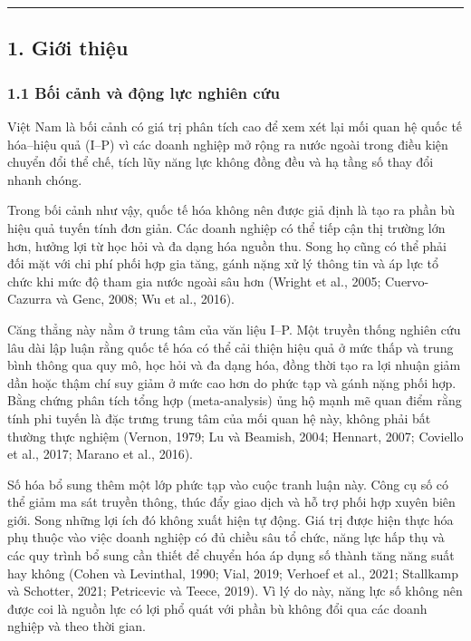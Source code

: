 \documentclass[12pt,a4paper]{article}
\begin{document}
\begin{center}\rule{0.5\linewidth}{0.5pt}\end{center}

\hypertarget{1-giux1edbi-thiux1ec7u}{%
\subsection{1. Giới thiệu}\label{1-giux1edbi-thiux1ec7u}}

\hypertarget{11-bux1ed1i-cux1ea3nh-vuxe0-ux111ux1ed9ng-lux1ef1c-nghiuxean-cux1ee9u}{%
\subsubsection{1.1 Bối cảnh và động lực nghiên
cứu}\label{11-bux1ed1i-cux1ea3nh-vuxe0-ux111ux1ed9ng-lux1ef1c-nghiuxean-cux1ee9u}}

Việt Nam là bối cảnh có giá trị phân tích cao để xem xét lại mối quan hệ
quốc tế hóa--hiệu quả (I--P) vì các doanh nghiệp mở rộng ra nước ngoài
trong điều kiện chuyển đổi thể chế, tích lũy năng lực không đồng đều và
hạ tầng số thay đổi nhanh chóng.

Trong bối cảnh như vậy, quốc tế hóa không nên được giả định là tạo ra
phần bù hiệu quả tuyến tính đơn giản. Các doanh nghiệp có thể tiếp cận
thị trường lớn hơn, hưởng lợi từ học hỏi và đa dạng hóa nguồn thu. Song
họ cũng có thể phải đối mặt với chi phí phối hợp gia tăng, gánh nặng xử
lý thông tin và áp lực tổ chức khi mức độ tham gia nước ngoài sâu hơn
(Wright et al., 2005; Cuervo-Cazurra và Genc, 2008; Wu et al., 2016).

Căng thẳng này nằm ở trung tâm của văn liệu I--P. Một truyền thống
nghiên cứu lâu dài lập luận rằng quốc tế hóa có thể cải thiện hiệu quả ở
mức thấp và trung bình thông qua quy mô, học hỏi và đa dạng hóa, đồng
thời tạo ra lợi nhuận giảm dần hoặc thậm chí suy giảm ở mức cao hơn do
phức tạp và gánh nặng phối hợp. Bằng chứng phân tích tổng hợp
(meta-analysis) ủng hộ mạnh mẽ quan điểm rằng tính phi tuyến là đặc
trưng trung tâm của mối quan hệ này, không phải bất thường thực nghiệm
(Vernon, 1979; Lu và Beamish, 2004; Hennart, 2007; Coviello et al.,
2017; Marano et al., 2016).

Số hóa bổ sung thêm một lớp phức tạp vào cuộc tranh luận này. Công cụ số
có thể giảm ma sát truyền thông, thúc đẩy giao dịch và hỗ trợ phối hợp
xuyên biên giới. Song những lợi ích đó không xuất hiện tự động. Giá trị
được hiện thực hóa phụ thuộc vào việc doanh nghiệp có đủ chiều sâu tổ
chức, năng lực hấp thụ và các quy trình bổ sung cần thiết để chuyển hóa
áp dụng số thành tăng năng suất hay không (Cohen và Levinthal, 1990;
Vial, 2019; Verhoef et al., 2021; Stallkamp và Schotter, 2021;
Petricevic và Teece, 2019). Vì lý do này, năng lực số không nên được coi
là nguồn lực có lợi phổ quát với phần bù không đổi qua các doanh nghiệp
và theo thời gian.
\end{document}
